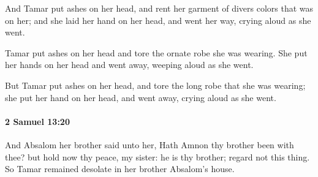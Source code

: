 			\begin{versebox}
					\item[BHS] 
					\item[ASV] And Tamar put ashes on her head, and rent her garment of divers colors that was on her; and she laid her hand on her head, and went her way, crying aloud as she went.
					\item[NIV] Tamar put ashes on her head and tore the ornate robe she was wearing. She put her hands on her head and went away, weeping aloud as she went.
					\item[NRSV] But Tamar put ashes on her head, and tore the long robe that she was wearing; she put her hand on her head, and went away, crying aloud as she went.
			\end{versebox}

		\paragraph{2 Samuel 13:20} %
			\label{2SAMUEL-13-20}

			And Absalom her brother said unto her, Hath Amnon thy brother been with thee? but hold now thy peace, my sister: he is thy brother; regard not this thing. So Tamar remained desolate in her brother Absalom’s house.

